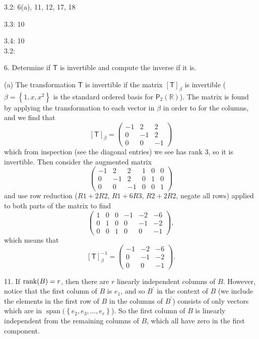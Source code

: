 \documentclass[11pt]{article}
\newcommand{\sbr}[1]{\left[#1\right]}
\newcommand{\cbr}[1]{\left\{#1\right\}}
\DeclareMathOperator{\Span}{span}
\begin{document}
3.2: 6(a), 11, 12, 17, 18

3.3: 10

3.4: 10 \\

3.2:

6. Determine if $\mathsf{T}$ is invertible and compute the inverse if it is.

(a) The transformation $\mathsf{T}$ is invertible if the matrix $\sbr{\mathsf{T}}_{\beta}$ is invertible ($\beta = \cbr{1,x,x^2}$ is the standard ordered basis for $\mathsf{P}_2(\mathbb{R})$). The matrix is found by applying the transformation to each vector in $\beta$ in order to for the columns, and we find that $$\sbr{\mathsf{T}}_{\beta} = \begin{pmatrix}
    -1 & 2 & 2 \\
    0 & -1 & 2 \\
    0 & 0 & -1
\end{pmatrix}$$ which from inspection (see the diagonal entries) we see has rank $3$, so it is invertible. Then consider the augmented matrix $$\left(\begin{array}{ccc|ccc}
    -1 & 2 & 2 & 1 & 0 & 0 \\
    0 & -1 & 2 & 0 & 1 & 0 \\
    0 & 0 & -1 & 0 & 0 & 1 
  \end{array}\right)$$ and use row reduction ($R1+2R2$, $R1+6R3$, $R2+2R2$, negate all rows) applied to both parts of the matrix to find $$\left(\begin{array}{ccc|ccc}
    1 & 0 & 0 & -1 & -2 & -6 \\
    0 & 1 & 0 & 0 & -1 & -2 \\
    0 & 0 & 1 & 0 & 0 & -1 
  \end{array}\right),$$ which means that $$\sbr{\mathsf{T}}_{\beta}^{-1} = \begin{pmatrix}
    -1 & -2 & -6 \\
    0 & -1 & -2 \\
    0 & 0 & -1
\end{pmatrix}.$$

11. If $\rank(B) = r$, then there are $r$ linearly independent columns of $B$. However, notice that the first column of $B$ is $e_1$, and so $B^{\prime}$ in the context of $B$ (we include the elements in the first row of $B$ in the columns of $B^{\prime}$) consists of only vectors which are in $\Span(\cbr{e_2,e_3,\dots, e_{r}}$). So the first column of $B$ is linearly independent from the remaining columns of $B$, which all have zero in the first component.
\end{document}
